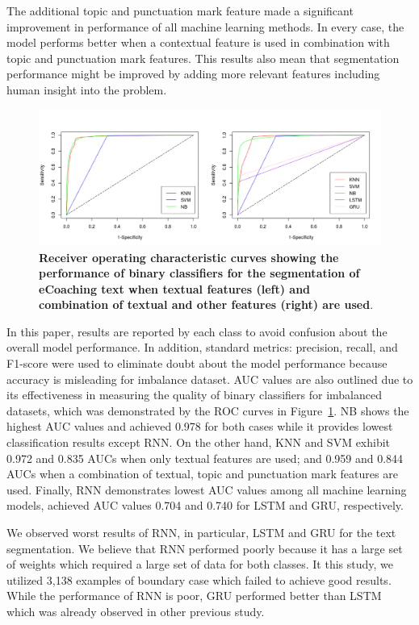 \documentclass{amia}
\begin{document}
The additional topic and punctuation mark feature made a significant improvement in performance of all machine learning methods. In every case, the model performs better when a contextual feature is used in combination with topic and punctuation mark features. This results also mean that segmentation performance might be improved by adding more relevant features including human insight into the problem.       

\begin{figure}[!htb]
    \centering
    \includegraphics[width=1.0\textwidth]{figures/roc-curves.png}
    \caption{\textbf{Receiver operating characteristic curves showing the performance of binary classifiers for the segmentation of eCoaching text when textual features (left) and combination of textual and other features (right) are used}.}
    \label{fig:roc-curves}
\end{figure}

In this paper, results are reported by each class to avoid confusion about the overall model performance. In addition, standard metrics: precision, recall, and F1-score were used to eliminate doubt about the model performance because accuracy is misleading for imbalance dataset. AUC values are also outlined due to its effectiveness in measuring the quality of binary classifiers for imbalanced datasets\cite{hu2015kernelized}, which was demonstrated by the ROC curves in Figure~\ref{fig:roc-curves}. NB shows the highest AUC values and achieved 0.978 for both cases while it provides lowest classification results except RNN. On the other hand, KNN and SVM exhibit 0.972 and 0.835 AUCs when only textual features are used; and 0.959 and 0.844 AUCs when a combination of textual, topic and punctuation mark features are used. Finally, RNN demonstrates lowest AUC values among all machine learning models, achieved AUC values 0.704 and 0.740 for LSTM and GRU, respectively. 

We observed worst results of RNN, in particular, LSTM and GRU for the text segmentation. We believe that RNN performed poorly because it has a large set of weights which required a large set of data for both classes. It this study, we utilized 3,138 examples of boundary case which failed to achieve good results. While the performance of RNN is poor, GRU performed better than LSTM which was already observed in other previous study\cite{chung2014empirical}.
\end{document}
